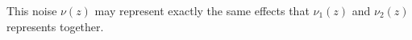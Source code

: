 \documentclass{sig-alternate-05-2015}
\begin{document}
%



%

This noise $\nu(z)$ may represent exactly the same effects that $\nu_{1}(z)$
and $\nu_{2}(z)$ represents together.
\end{document}
